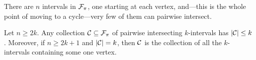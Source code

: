 \begin{figure}[H]
    \centering
\end{figure}

There are $n$ intervals in $\mathcal{F}_{\pi}$, one starting at each vertex, and---this is the whole point of moving to a cycle---very few of them can pairwise intersect.

\begin{boxlemma} \label{Ch3:Lemma:Intersecting_Intervals}
    Let $n \geq 2k$. Any collection $\mathcal{C} \subseteq \mathcal{F}_{\pi}$ of pairwise intersecting $k$-intervals has $\left\lvert \mathcal{C} \right\rvert \leq k$. Moreover, if $n \geq 2k + 1$ and $\left\lvert \mathcal{C} \right\rvert = k$, then $\mathcal{C}$ is the collection of all the $k$-intervals containing some one vertex.
\end{boxlemma}
